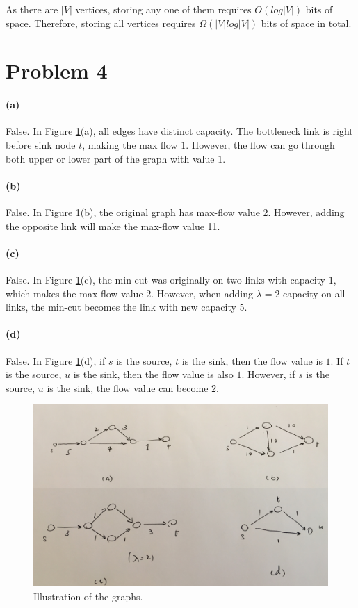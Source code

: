 \documentclass[12pt]{article}
\begin{document}
As there are $|V|$ vertices, storing any one of them requires $O(log|V|)$ bits of space. Therefore, storing all vertices requires $\Omega(|V|log|V|)$ bits of space in total.

\pagebreak

\section*{Problem 4}
\paragraph{(a)} False. In Figure \ref{fig:4}(a), all edges have distinct capacity. The bottleneck link is right before sink node $t$, making the max flow $1$. However, the flow can go through both upper or lower part of the graph with value $1$.
\paragraph{(b)} False. In Figure \ref{fig:4}(b), the original graph has max-flow value 2. However, adding the opposite link will make the max-flow value 11.
\paragraph{(c)} False. In Figure \ref{fig:4}(c), the min cut was originally on two links with capacity $1$, which makes the max-flow value $2$. However, when adding $\lambda=2$ capacity on all links, the min-cut becomes the link with new capacity $5$.
\paragraph{(d)} False. In Figure \ref{fig:4}(d), if $s$ is the source, $t$ is the sink, then the flow value is $1$. If $t$ is the source, $u$ is the sink, then the flow value is also $1$. However, if $s$ is the source, $u$ is the sink, the flow value can become $2$.
\begin{figure}
	\centering
	\includegraphics[width=1\textwidth]{4.jpg}
	\caption{Illustration of the graphs.} \label{fig:4}
\end{figure}
\end{document}
